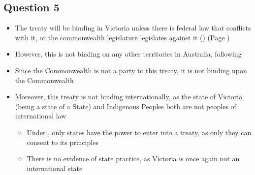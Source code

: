 \subsection*{Question 5}
\begin{itemize}
    \item The treaty will be binding in Victoria unless there is federal law that conflicts with it, or the commonwealth legislature legislates against it () (Page \pageref{case:Commonwealth v Tasmania})
    \item However, this is not binding on any other territories in Australia, following 
    \item Since the Commonwealth is not a party to this treaty, it is not binding upon the Commonwealth
    \item Moreover, this treaty is not binding internationally, as the state of Victoria (being a state of a State) and Indigenous Peoples both are not peoples of international law
    \begin{itemize}
        \item Under , only states have the power to enter into a treaty, as only they can consent to its principles
        \item There is no evidence of state practice, as Victoria is once again not an international state
    \end{itemize}
\end{itemize}